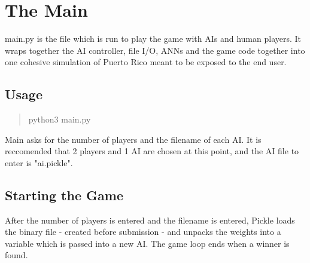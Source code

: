\section{The Main }

main.py is the file which is run to play the game with AIs and human players.  It wraps together the AI controller, file I/O, ANNs and the game code together into one cohesive simulation of Puerto Rico meant to be exposed to the end user.

\subsection{Usage}

\begin{quote}

python3 main.py

\end{quote} 

Main asks for the number of players and the filename of each AI.  It is reccomended that 2 players and 1 AI are chosen at this point, and the AI file to enter is "ai.pickle".

\subsection{Starting the Game}

After the number of players is entered and the filename is entered, Pickle loads the binary file - created before submission - and unpacks the weights into a variable which is passed into a new AI.
The game loop ends when a winner is found.